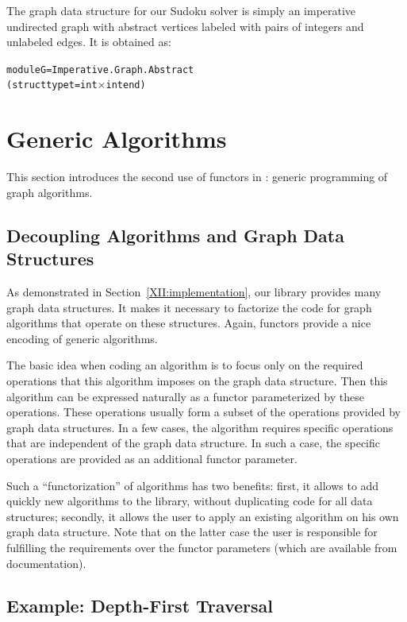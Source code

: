 The graph data structure for our Sudoku solver is simply an imperative
undirected graph with abstract vertices labeled with pairs of integers
and unlabeled edges. It is obtained as:
\begin{alltt}
module G = Imperative.Graph.Abstract
             (struct type t = int \ensuremath{\times} int end) 
\end{alltt}

\section{Generic Algorithms}\label{XII:algos}

This section introduces the second use of functors in \ocamlgraph:
generic programming of graph algorithms.

\subsection{Decoupling Algorithms and Graph Data Structures}

As demonstrated in Section~\ref{XII:implementation}, our library provides
many graph data structures. It makes it necessary to factorize the
code for graph algorithms that operate on these structures. Again,
functors provide a nice encoding of generic algorithms.

The basic idea when coding an algorithm is to focus only on the
required operations that this algorithm imposes on the graph data
structure. Then this algorithm can be expressed naturally as a functor
parameterized by these operations. These operations usually form a
subset of the operations provided by \ocamlgraph graph data
structures. In a few cases, the algorithm requires specific operations
that are independent of the graph data structure. In such a case, the
specific operations are provided as an additional functor parameter.

Such a ``functorization'' of algorithms has two benefits: first, it
allows to add quickly new algorithms to the library, without
duplicating code for all data structures; secondly, it allows the user to
apply an existing algorithm on his own graph data structure.
Note that on the latter case the user is responsible for fulfilling
the requirements over the functor parameters (which are available from
\ocamlgraph documentation).

\subsection{Example: Depth-First Traversal}
\label{XII:dfs}

